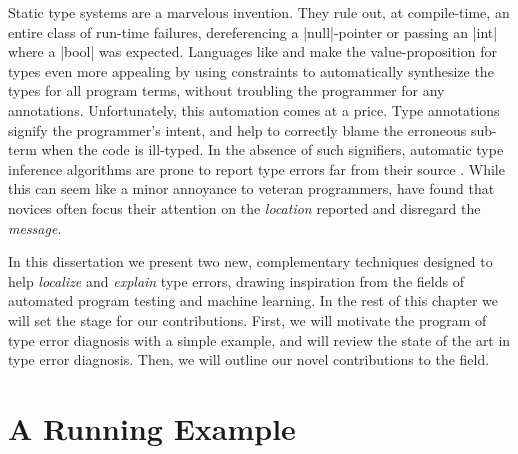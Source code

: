 Static type systems are a marvelous invention.
%
They rule out, at compile-time, an entire class of run-time failures,
\eg dereferencing a |null|-pointer or passing an |int| where a |bool|
was expected.
%
Languages like \ocaml and \haskell make
the value-proposition for types even more
appealing by using constraints to automatically
synthesize the types for all program terms,
without troubling the programmer for any
annotations.
%
Unfortunately, this automation comes at a price.
%
Type annotations signify the programmer's intent, and help to correctly
blame the erroneous sub-term when the code is ill-typed.
%
In the absence of such signifiers, automatic type inference algorithms
are prone to report type errors far from their source
\citep{Wand1986-nw}.
%
While this can seem like a minor annoyance to veteran programmers,
\citet{Joosten1993-yx} have found that novices often focus their
attention on the \emph{location} reported and disregard the
\emph{message}.

In this dissertation we present two new, complementary techniques
designed to help \emph{localize} and \emph{explain} type errors, drawing
inspiration from the fields of automated program testing and machine
learning.
%
In the rest of this chapter we will set the stage for our contributions.
%
First, we will motivate the program of type error diagnosis with a
simple example, and will review the state of the art in type error
diagnosis.
%
%
Then, we will outline our novel contributions to the field.


\section{A Running Example}
\label{sec:intro:sumList}

